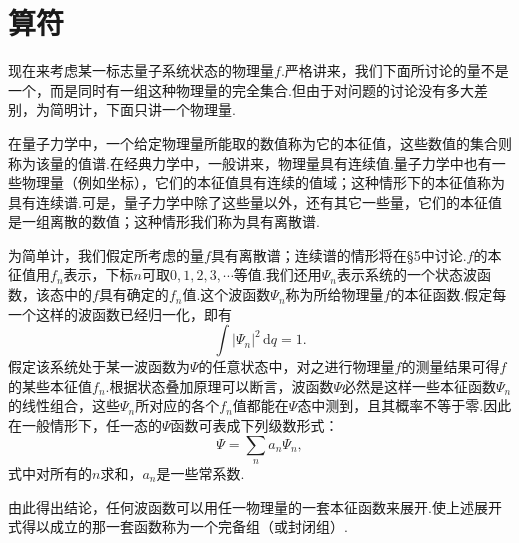 \section{算符}

现在来考虑某一标志量子系统状态的物理量$f$.严格讲来，我们下面所讨论的量不是一个，而是同时有一组这种物理量的完全集合.但由于对问题的讨论没有多大差别，为简明计，下面只讲一个物理量.

在量子力学中，一个给定物理量所能取的数值称为它的本征值，这些数值的集合则称为该量的值谱.在经典力学中，一般讲来，物理量具有连续值.量子力学中也有一些物理量（例如坐标），它们的本征值具有连续的值域；这种情形下的本征值称为具有连续谱.可是，量子力学中除了这些量以外，还有其它一些量，它们的本征值是一组离散的数值；这种情形我们称为具有离散谱.

为简单计，我们假定所考虑的量$f$具有离散谱；连续谱的情形将在§5中讨论.$f$的本征值用$f_n$表示，下标$n$可取$0,1,2,3,\cdots$等值.我们还用$\varPsi_n$表示系统的一个状态波函数，该态中的$f$具有确定的$f_n$值.这个波函数$\varPsi_n$称为所给物理量$f$的本征函数.假定每一个这样的波函数已经归一化，即有
\begin{equation}
  \int|\varPsi_n|^2\,\mathrm{d}q=1.
\end{equation}
假定该系统处于某一波函数为$\varPsi$的任意状态中，对之进行物理量$f$的测量结果可得$f$的某些本征值$f_n$.根据状态叠加原理可以断言，波函数$\varPsi$必然是这样一些本征函数$\varPsi_n$的线性组合，这些$\varPsi_n$所对应的各个$f_n$值都能在$\varPsi$态中测到，且其概率不等于零.因此在一般情形下，任一态的$\varPsi$函数可表成下列级数形式：
\begin{equation}
  \varPsi=\sum_n a_n\varPsi_n,
\end{equation}
式中对所有的$n$求和，$a_n$是一些常系数.

由此得出结论，任何波函数可以用任一物理量的一套本征函数来展开.使上述展开式得以成立的那一套函数称为一个完备组（或封闭组）.

